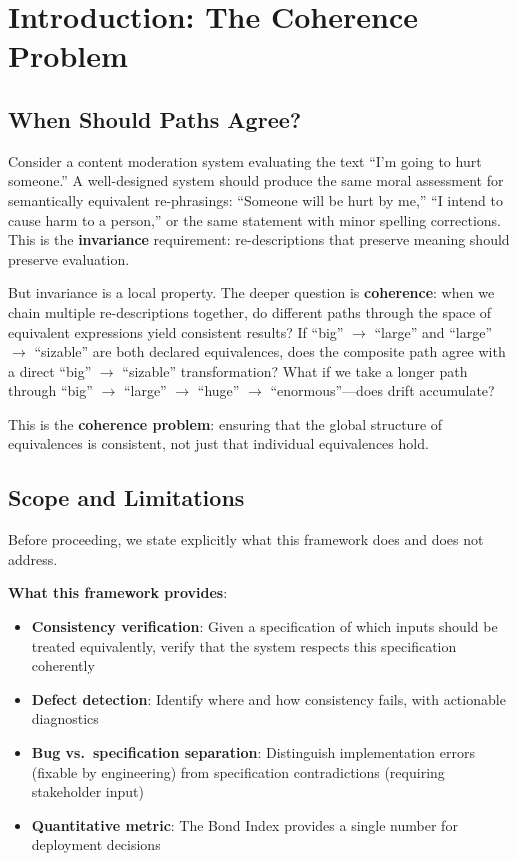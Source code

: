 \documentclass[12pt]{article}
\begin{document}
\section{Introduction: The Coherence Problem}

\subsection{When Should Paths Agree?}

Consider a content moderation system evaluating the text ``I'm going to hurt someone.'' A well-designed system should produce the same moral assessment for semantically equivalent re-phrasings: ``Someone will be hurt by me,'' ``I intend to cause harm to a person,'' or the same statement with minor spelling corrections. This is the \textbf{invariance} requirement: re-descriptions that preserve meaning should preserve evaluation.

But invariance is a local property. The deeper question is \textbf{coherence}: when we chain multiple re-descriptions together, do different paths through the space of equivalent expressions yield consistent results? If ``big'' $\to$ ``large'' and ``large'' $\to$ ``sizable'' are both declared equivalences, does the composite path agree with a direct ``big'' $\to$ ``sizable'' transformation? What if we take a longer path through ``big'' $\to$ ``large'' $\to$ ``huge'' $\to$ ``enormous''---does drift accumulate?

This is the \textbf{coherence problem}: ensuring that the global structure of equivalences is consistent, not just that individual equivalences hold.

\subsection{Scope and Limitations}

Before proceeding, we state explicitly what this framework does and does not address.

\textbf{What this framework provides}:
\begin{itemize}
    \item \textbf{Consistency verification}: Given a specification of which inputs should be treated equivalently, verify that the system respects this specification coherently
    \item \textbf{Defect detection}: Identify where and how consistency fails, with actionable diagnostics
    \item \textbf{Bug vs.\ specification separation}: Distinguish implementation errors (fixable by engineering) from specification contradictions (requiring stakeholder input)
    \item \textbf{Quantitative metric}: The Bond Index provides a single number for deployment decisions
\end{itemize}
\end{document}
